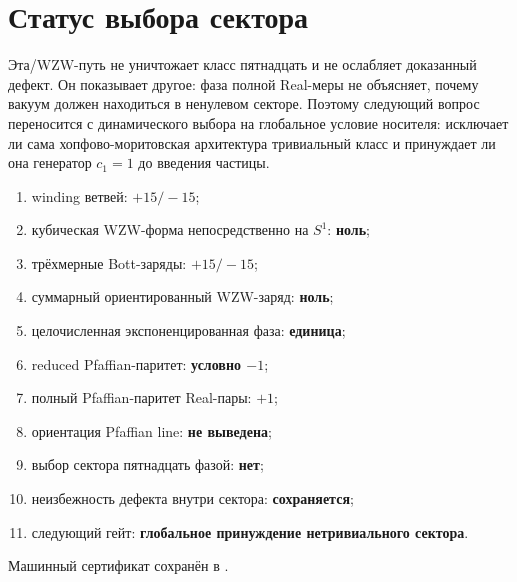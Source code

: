 \section{Статус выбора сектора}

Эта/WZW-путь не уничтожает класс пятнадцать и не ослабляет доказанный
дефект. Он показывает другое: фаза полной Real-меры не объясняет, почему
вакуум должен находиться в ненулевом секторе. Поэтому следующий вопрос
переносится с динамического выбора на глобальное условие носителя:
исключает ли сама хопфово-моритовская архитектура тривиальный класс и
принуждает ли она генератор $c_1=1$ до введения частицы.

\begin{protocol}
\begin{enumerate}
 \item winding ветвей: \textbf{$+15/-15$};
 \item кубическая WZW-форма непосредственно на $S^1$: \textbf{ноль};
 \item трёхмерные Bott-заряды: \textbf{$+15/-15$};
 \item суммарный ориентированный WZW-заряд: \textbf{ноль};
 \item целочисленная экспоненцированная фаза: \textbf{единица};
 \item reduced Pfaffian-паритет: \textbf{условно $-1$};
 \item полный Pfaffian-паритет Real-пары: \textbf{$+1$};
 \item ориентация Pfaffian line: \textbf{не выведена};
 \item выбор сектора пятнадцать фазой: \textbf{нет};
 \item неизбежность дефекта внутри сектора: \textbf{сохраняется};
 \item следующий гейт: \textbf{глобальное принуждение нетривиального сектора}.
\end{enumerate}
\end{protocol}

Машинный сертификат сохранён в
.